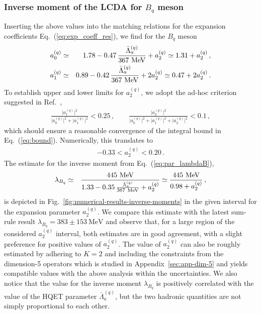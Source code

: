 \documentclass[a4paper,11pt]{article}
\begin{document}
\subsubsection*{Inverse moment of the LCDA for $B_q$ meson}

Inserting the above values into the matching relations for the expansion coefficients Eq.~(\ref{eq:exp_coeff_res}), we find for the $B_q$ meson
\begin{eqnarray}
    a^{(q)}_0 &\simeq& 1.78 - 0.47 \, \frac{\bar \Lambda_a^{(q)}}{367~{\rm MeV}} + a_2^{(q)} \simeq 1.31 + a^{(q)}_2 \,, \cr 
    a^{(q)}_1 &\simeq& 0.89 - 0.42 \, \frac{\bar \Lambda_a^{(q)}}{367~{\rm MeV}} + 2 a_2^{(q)} \simeq 0.47 + 2 a^{(q)}_2 \,.
\end{eqnarray}
%
To establish upper and lower limits for $a^{(q)}_2$, we adopt the ad-hoc criterion suggested in Ref.~\cite{Feldmann:2022uok},
\begin{eqnarray}
    \frac{ \big| a^{(q)}_1 \big|^2 }{ \big| a^{(q)}_0 \big|^2 + \big| a^{(q)}_1 \big|^2 } < 0.25 \,, \qquad 
    \frac{ \big| a^{(q)}_2 \big|^2 }{ \big| a^{(q)}_0 \big|^2 + \big| a^{(q)}_1 \big|^2 + \big| a^{(q)}_2 \big|^2 } < 0.1 \,,
\label{eq:crit}
\end{eqnarray}
which should ensure a reasonable convergence of the integral bound in Eq.~(\ref{eq:bound}).
%
Numerically, this translates to
\begin{eqnarray}
    -0.33 < a^{(q)}_2 < 0.20 \,.
    \label{eq:critq}
\end{eqnarray}
%
The estimate for the inverse moment from Eq.~(\ref{eq:par_lambdaB}),
\begin{eqnarray}
 \lambda_{B_q} &\simeq & \frac{445~{\rm MeV}}{1.33 - 0.35 \, \frac{\bar\Lambda_a^{(q)}}{367~{\rm MeV}} + a_2^{(q)}} 
 \simeq \frac{445~{\rm MeV}}{0.98 + a_2^{(q)}} \,,
\end{eqnarray}
is depicted in Fig.~\ref{fig:numerical-results-inverse-moments} in the given interval for the expansion parameter $a_2^{(q)}$. 
We compare this estimate with the latest sum-rule result $\lambda_{B_q} = 383\pm153~\mathrm{MeV}$ \cite{Khodjamirian:2020hob} 
and observe that, for a large region of the considered $a_2^{(q)}$ interval, both estimates are in good agreement,
with a slight preference for positive values of $a_2^{(q)}$. 
The value of $a_2^{(q)}$ can also be roughly estimated by adhering to $K=2$ and including the constraints from 
the dimension-5 operators which is studied in Appendix~\ref{sec:app-dim-5} and yields compatible values 
with the above analysis within the uncertainties.
%
We also notice that the value for the inverse moment $\lambda_{B_q}$ 
is positively correlated with the value of the HQET parameter $\bar\Lambda_a^{(q)}$, 
but the two hadronic quantities are not simply proportional to each other.
\end{document}
